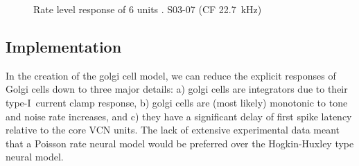 \begin{figure}[htb]
  \centering
\caption{Rate level response of 6 units \citep[from~Fig.~2]{GhoshalKim:1997}. S03-07 (CF 22.7~kHz) }\label{fig:GolgiKimFig2}
\end{figure}


\clearpage
\subsection{Implementation}

In the creation of the golgi cell model, we can reduce the explicit
responses of Golgi cells down to three major details: a) golgi cells
are integrators due to their type-I~current clamp response, b) golgi
cells are (most likely) monotonic to tone and noise rate increases,
and c) they have a significant delay of first spike latency relative
to the core VCN units. The lack of extensive experimental data meant
that a Poisson rate neural model would be preferred over the
Hogkin-Huxley type neural model.

